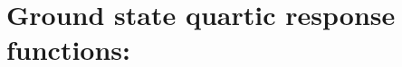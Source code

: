 
\section{Ground state quartic response functions: }
\label{sec:cc4r}

\begin{description}
\item[] 
\item[] 
\item[] 
\item[] 
\item[] 
\item[] 
\item[] 
%
\end{description}
